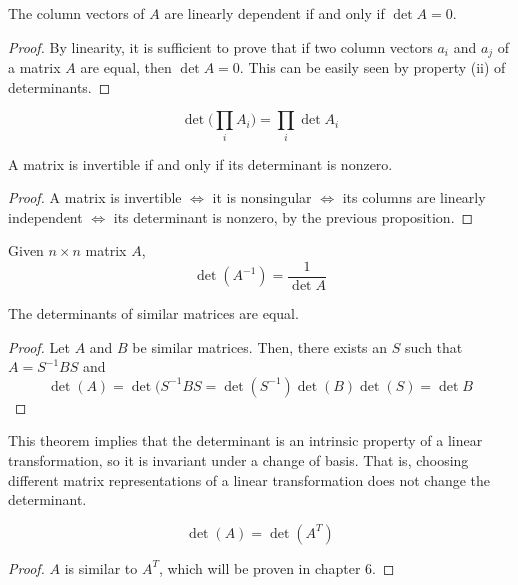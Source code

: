 \documentclass{article}
\begin{document}
  \begin{proposition}
  The column vectors of $A$ are linearly dependent if and only if $\det{A} = 0$. 
  \end{proposition}
  \begin{proof}
  By linearity, it is sufficient to prove that if two column vectors $a_i$ and $a_j$ of a matrix $A$ are equal, then $\det{A} = 0$. This can be easily seen by property (ii) of determinants. 
  \end{proof}

  \begin{theorem}
  \[ \det{\bigg(\prod_i A_i \bigg)} = \prod_i \det{A_i}\]
  \end{theorem}

  \begin{theorem}
  A matrix is invertible if and only if its determinant is nonzero. 
  \end{theorem}
  \begin{proof}
  A matrix is invertible $\iff$ it is nonsingular $\iff$ its columns are linearly independent $\iff$ its determinant is nonzero, by the previous proposition. 
  \end{proof}

  \begin{corollary}
  Given $n \times n$ matrix $A$,
  \[\det{(A^{-1})} = \frac{1}{\det{A}}\]
  \end{corollary}

  \begin{theorem}
  The determinants of similar matrices are equal. 
  \end{theorem}
  \begin{proof}
  Let $A$ and $B$ be similar matrices. Then, there exists an $S$ such that $A = S^{-1} B S$ and 
  \[ \det{(A)} = \det{(S^{-1} B S} = \det{(S^{-1})} \det{(B)} \det{(S)} = \det{B}\]
  \end{proof}

  This theorem implies that the determinant is an intrinsic property of a linear transformation, so it is invariant under a change of basis. That is, choosing different matrix representations of a linear transformation does not change the determinant.  

  \begin{corollary}
  \[\det{(A)} = \det{(A^T)}\]
  \end{corollary}
  \begin{proof}
  $A$ is similar to $A^T$, which will be proven in chapter 6. 
  \end{proof}
\end{document}
